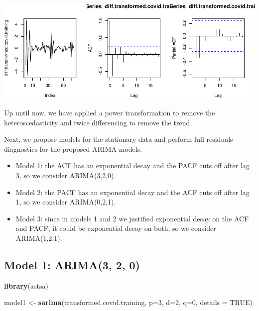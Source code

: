 \documentclass[]{article}
\newenvironment{Shaded}{\begin{snugshade}}{\end{snugshade}}
\newcommand{\DataTypeTok}[1]{\textcolor[rgb]{0.13,0.29,0.53}{#1}}
\newcommand{\DecValTok}[1]{\textcolor[rgb]{0.00,0.00,0.81}{#1}}
\newcommand{\KeywordTok}[1]{\textcolor[rgb]{0.13,0.29,0.53}{\textbf{#1}}}
\newcommand{\NormalTok}[1]{#1}
\newcommand{\OtherTok}[1]{\textcolor[rgb]{0.56,0.35,0.01}{#1}}
\newcommand{\StringTok}[1]{\textcolor[rgb]{0.31,0.60,0.02}{#1}}
\providecommand{\tightlist}{%
  \setlength{\itemsep}{0pt}\setlength{\parskip}{0pt}}
\begin{document}
\begin{center}\includegraphics{Q5_files/figure-latex/unnamed-chunk-8-1} \end{center}

Up until now, we have applied a power transformation to remove the
heteroscedasticity and twice differencing to remove the trend.

Next, we propose models for the stationary data and perform full
residuals diagnostics for the proposed ARIMA models.

\begin{itemize}
\tightlist
\item
  Model 1: the ACF has an exponential decay and the PACF cuts off after
  lag 3, so we consider ARIMA(3,2,0).
\item
  Model 2: the PACF has an exponential decay and the ACF cuts off after
  lag 1, so we consider ARIMA(0,2,1).
\item
  Model 3: since in models 1 and 2 we justified exponential decay on the
  ACF and PACF, it could be exponential decay on both, so we consider
  ARIMA(1,2,1).
\end{itemize}

\newpage

\hypertarget{model-1-arima3-2-0}{%
\subsection{Model 1: ARIMA(3, 2, 0)}\label{model-1-arima3-2-0}}

\begin{Shaded}
\begin{Highlighting}[]
\KeywordTok{library}\NormalTok{(astsa)}

\NormalTok{model1 <-}\StringTok{ }\KeywordTok{sarima}\NormalTok{(transformed.covid.training, }\DataTypeTok{p=}\DecValTok{3}\NormalTok{, }\DataTypeTok{d=}\DecValTok{2}\NormalTok{, }\DataTypeTok{q=}\DecValTok{0}\NormalTok{, }\DataTypeTok{details =} \OtherTok{TRUE}\NormalTok{)}
\end{Highlighting}
\end{Shaded}
\end{document}
